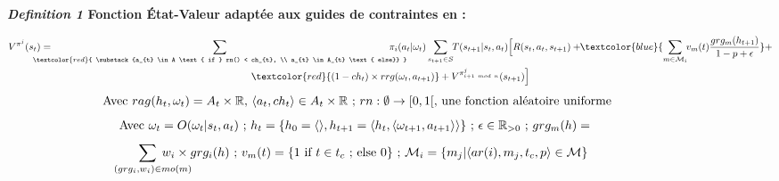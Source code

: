 \begin{figure}[h!]
    \label{eq:single_value_function}
    \raggedright
    \textbf{\textit{Definition 1} \quad Fonction État-Valeur adaptée aux guides de contraintes en  :}

    \begin{scriptsize}
        \vspace{-0.6cm}
        \begin{gather*}
            V^{\pi^j}(s_t) = \hspace{-0.75cm}
            \sum_{\textcolor{red}{ \substack{a_{t} \in A \text{ if } rn() < ch_{t}, \\
                        a_{t} \in A_{t} \text{ else}}
                }}{\hspace{-0.7cm} \pi_i(a_{t} | \omega_t)}
            \sum_{s_{t+1} \in S}
            {\hspace{-0.1cm} T(s_{t+1} | s_t, a_{t})
            \Bigl[R(s_t,a_{t},s_{t+1}) + \hspace{-0.1cm}
            \textcolor{blue}{ \sum_{m \in \mathcal{M}_i}{ \hspace{-0.1cm} v_m(t) \frac{grg_m(h_{t+1})}{1 - p + \epsilon} } }
            + } \\
            {\textcolor{red}{(1-ch_t) \times rrg(\omega_t,a_{t+1})} + V^{\pi^j_{i+1 \ mod \ n}}(s_{t+1})\Bigr]}
        \end{gather*}
        \vspace{-0.5cm}
        \textcolor{red}{\[\text{ \hspace{-0.1cm} Avec } rag(h_t, \omega_t) = A_{t} \times \mathbb{R} \text{, } \langle a_t, ch_{t} \rangle \in A_{t} \times \mathbb{R} \text{ ; } rn: \emptyset \to [0,1[ \text{, une fonction aléatoire uniforme}\]}
        \vspace{-0.6cm}
        \textcolor{blue}{
            \begin{gather*}
                \hspace{-0.001cm}
                \text{Avec } \omega_t = O(\omega_t | s_t, a_t) \text{ ; } h_t = \{h_0 = \langle \rangle, h_{t+1} = \langle h_t, \langle \omega_{t+1}, a_{t+1} \rangle \rangle \} \text{ ; } \epsilon \in \mathbb{R}_{>0} \text{ ; } grg_m(h) =
            \end{gather*}
        }
        \vspace{-0.95cm}
        \textcolor{blue}{
            \begin{gather*}
                \hspace{-0.5cm} \sum_{\hspace{0.3cm}(grg_i,w_i) \in mo(m)}{\hspace{-0.9cm} w_i \times grg_i(h)}
                \text{ ; } v_m(t) = \{ 1 \text{ if } t \in t_c \text{ ; else } 0 \} \text{ ; } \mathcal{M}_i = \{m_j | \langle ar(i),m_j,t_c,p \rangle \in \mathcal{M}\}
            \end{gather*}
        }
        \vspace{-0.6cm}
    \end{scriptsize}

\end{figure}

